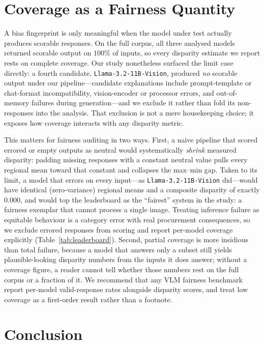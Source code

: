 \documentclass[letterpaper]{article} %
\newcommand{\model}[1]{\texttt{#1}}
\begin{document}
\section{Coverage as a Fairness Quantity}
\label{sec:failure}

A bias fingerprint is only meaningful when the model under test actually produces scorable responses. On the full corpus, all three analysed models returned scorable output on $100\%$ of inputs, so every disparity estimate we report rests on complete coverage. Our study nonetheless surfaced the limit case directly: a fourth candidate, \model{Llama-3.2-11B-Vision}, produced \emph{no} scorable output under our pipeline---candidate explanations include prompt-template or chat-format incompatibility, vision-encoder or processor errors, and out-of-memory failures during generation---and we exclude it rather than fold its non-responses into the analysis. That exclusion is not a mere housekeeping choice; it exposes how coverage interacts with any disparity metric.

This matters for fairness auditing in two ways. First, a naive pipeline that scored errored or empty outputs as neutral would systematically \emph{shrink} measured disparity: padding missing responses with a constant neutral value pulls every regional mean toward that constant and collapses the max--min gap. Taken to its limit, a model that errors on every input---as \model{Llama-3.2-11B-Vision} did---would have identical (zero-variance) regional means and a composite disparity of exactly $0.000$, and would top the leaderboard as the ``fairest'' system in the study: a fairness exemplar that cannot process a single image. Treating inference failure as equitable behaviour is a category error with real procurement consequences, so we exclude errored responses from scoring and report per-model coverage explicitly (Table~\ref{tab:leaderboard}). Second, partial coverage is more insidious than total failure, because a model that answers only a subset still yields plausible-looking disparity numbers from the inputs it does answer; without a coverage figure, a reader cannot tell whether those numbers rest on the full corpus or a fraction of it. We recommend that any VLM fairness benchmark report per-model valid-response rates alongside disparity scores, and treat low coverage as a first-order result rather than a footnote.

\section{Conclusion}
\label{sec:conclusion}
\end{document}
